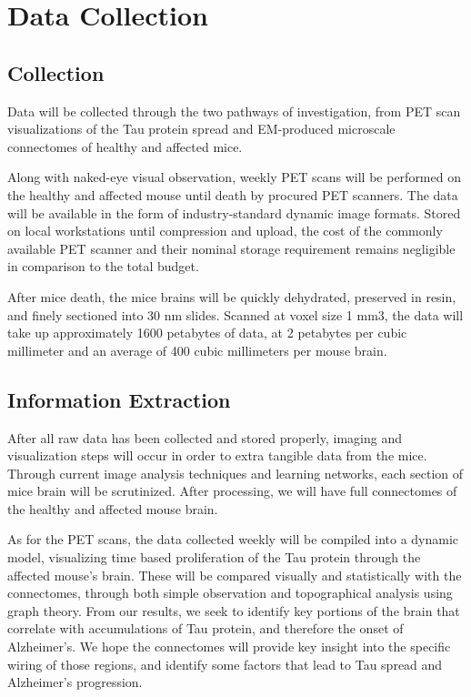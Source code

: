 \documentclass[11pt]{article}
\begin{document}
\section{Data Collection}

\subsection{Collection}

Data will be collected through the two pathways of investigation, from PET scan visualizations of the Tau protein spread and EM-produced microscale connectomes of healthy and affected mice. 

Along with naked-eye visual observation, weekly PET scans will be performed on the healthy and affected mouse until death by procured PET scanners. The data will be available in the form of industry-standard dynamic image formats. Stored on local workstations until compression and upload, the cost of the commonly available PET scanner and their nominal storage requirement remains negligible in comparison to the total budget. 

After mice death, the mice brains will be quickly dehydrated, preserved in resin, and finely sectioned into 30 nm slides. Scanned at voxel size 1 mm3, the data will take up approximately 1600 petabytes of data, at 2 petabytes per cubic millimeter and an average of 400 cubic millimeters per mouse brain. 

\subsection{Information Extraction}

After all raw data has been collected and stored properly, imaging and visualization steps will occur in order to extra tangible data from the mice. Through current image analysis techniques and learning networks, each section of mice brain will be scrutinized. After processing, we will have full connectomes of the healthy and affected mouse brain. 

As for the PET scans, the data collected weekly will be compiled into a dynamic model, visualizing time based proliferation of the Tau protein through the affected mouse's brain. These will be compared visually and statistically with the connectomes, through both simple observation and topographical analysis using graph theory. From our results, we seek to identify key portions of the brain that correlate with accumulations of Tau protein, and therefore the onset of Alzheimer's. We hope the connectomes will provide key insight into the specific wiring of those regions, and identify some factors that lead to Tau spread and Alzheimer's progression. 
\end{document}
